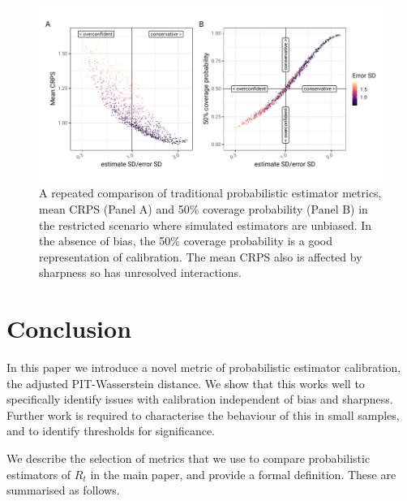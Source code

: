 \documentclass[a4paper, 12pt, twoside]{article}
\let\Oldsection\section
\renewcommand{\section}{\FloatBarrier\Oldsection}
\begin{document}
\begin{figure}[h!]
\centering
  \includegraphics{fig/fig4-metric-no-bias}
  \caption{A repeated comparison of traditional probabilistic estimator metrics, mean CRPS (Panel A) and 50\% coverage probability (Panel B) in the restricted scenario where simulated estimators are unbiased. In the absence of bias, the 50\% coverage probability is a good representation of calibration. The mean CRPS also is affected by sharpness so has unresolved interactions.}
\label{fig:S2.4}
\end{figure}

\section{Conclusion}

In this paper we introduce a novel metric of probabilistic estimator calibration, the adjusted PIT-Wasserstein distance. We show that this works well to specifically identify issues with calibration independent of bias and sharpness. Further work is required to characterise the behaviour of this in small samples, and to identify thresholds for significance.

We describe the selection of metrics that we use to compare probabilistic estimators of $R_t$ in the main paper, and provide a formal definition. These are summarised as follows.
\end{document}
